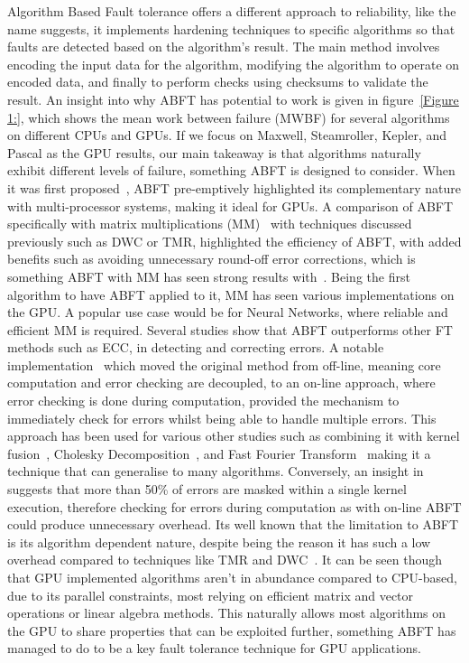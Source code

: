 \documentclass{article}
\begin{document}
Algorithm Based Fault tolerance offers a different approach to reliability, like the name suggests, it implements hardening techniques to specific algorithms so that faults are detected based on the algorithm's result. The main method involves encoding the input data for the algorithm, modifying the algorithm to operate on encoded data, and finally to perform checks using checksums to validate the result. An insight into why ABFT has potential to work is given in figure~\ref{Figure 1:}, which shows the mean work between failure (MWBF) for several algorithms on different CPUs and GPUs. If we focus on Maxwell, Steamroller, Kepler, and Pascal as the GPU results, our main takeaway is that algorithms naturally exhibit different levels of failure, something ABFT is designed to consider. When it was first proposed~\cite{3}, ABFT pre-emptively highlighted its complementary nature with multi-processor systems, making it ideal for GPUs. A comparison of ABFT specifically with matrix multiplications (MM)~\cite{6604090} with techniques discussed previously such as DWC or TMR, highlighted the efficiency of ABFT, with added benefits such as avoiding unnecessary round-off error corrections, which is something ABFT with MM has seen strong results with~\cite{6903601}. Being the first algorithm to have ABFT applied to it, MM has seen various implementations on the GPU. A popular use case would be for Neural Networks, where reliable and efficient MM is required. Several studies\cite{8536419} show that ABFT outperforms other FT methods such as ECC, in detecting and correcting errors. A notable implementation~\cite{5951924} which moved the original method from off-line, meaning core computation and error checking are decoupled, to an on-line approach, where error checking is done during computation, provided the mechanism to immediately check for errors whilst being able to handle multiple errors. This approach has been used for various other studies such as combining it with kernel fusion~\cite{10.1145/3577193.3593715}, Cholesky Decomposition~\cite{7516096}, and Fast Fourier Transform~\cite{10.1145/3710848.3710853} making it a technique that can generalise to many algorithms. Conversely, an insight in ~\cite{7877099} suggests that more than 50\% of errors are masked within a single kernel execution, therefore checking for errors during computation as with on-line ABFT could produce unnecessary overhead. Its well known that the limitation to ABFT is its algorithm dependent nature, despite being the reason it has such a low overhead compared to techniques like TMR and DWC~\cite{6604090}. It can be seen though that GPU implemented algorithms aren't in abundance compared to CPU-based, due to its parallel constraints, most relying on efficient matrix and vector operations or linear algebra methods. This naturally allows most algorithms on the GPU to share properties that can be exploited further, something ABFT has managed to do to be a key fault tolerance technique for GPU applications.
\end{document}
